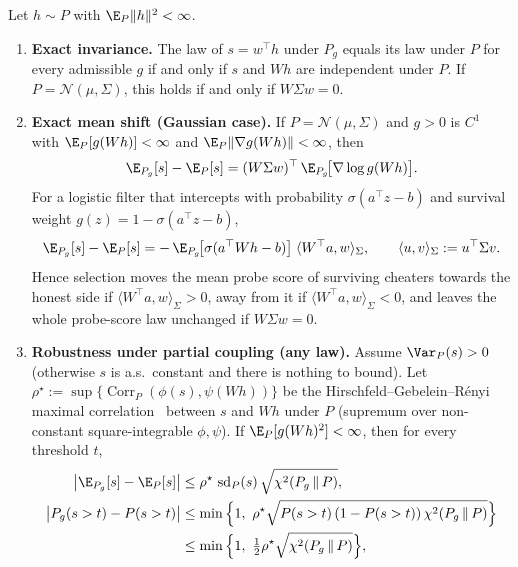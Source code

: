 \begin{theorem}\label{thm:geometry-selection}
Let $h \sim P$ with $\E_P\|h\|^2 < \infty$.
\begin{enumerate}
  \item \textbf{Exact invariance.} The law of $s = w^\top h$ under $P_g$ equals its law under $P$ for every admissible $g$ if and only if $s$ and $Wh$ are independent under $P$. If $P = \mathcal{N}(\mu, \Sigma)$, this holds if and only if $W \Sigma w = 0$.
  \item \textbf{Exact mean shift (Gaussian case).} If $P = \mathcal{N}(\mu, \Sigma)$ and $g > 0$ is $C^1$ with $\E_P[g(Wh)] < \infty$ and $\E_P\|\nabla g(Wh)\| < \infty$, then
  \begin{equation}\label{eq:stein-shift}
    \E_{P_g}[s] - \E_P[s] = (W \Sigma w)^\top\, \E_{P_g}\!\big[\nabla \log g(Wh)\big].
  \end{equation}
  For a logistic filter that intercepts with probability $\sigma(a^\top z - b)$ and survival weight $g(z) = 1 - \sigma(a^\top z - b)$,
  \begin{equation}\label{eq:logistic-shift}
    \E_{P_g}[s] - \E_P[s] = -\,\E_{P_g}\!\big[\sigma(a^\top W h - b)\big]\; \langle W^\top a, w \rangle_{\Sigma},
    \qquad \langle u, v \rangle_\Sigma := u^\top \Sigma v.
  \end{equation}
  Hence selection moves the mean probe score of surviving cheaters towards the honest side if $\langle W^\top a, w\rangle_\Sigma > 0$, away from it if $\langle W^\top a, w\rangle_\Sigma < 0$, and leaves the whole probe-score law unchanged if $W\Sigma w = 0$.
  \item \textbf{Robustness under partial coupling (any law).} Assume $\Var_P(s) > 0$ (otherwise $s$ is a.s.\ constant and there is nothing to bound). Let $\rho^\star := \sup\{\operatorname{Corr}_P(\phi(s), \psi(Wh))\}$ be the Hirschfeld--Gebelein--R\'enyi maximal correlation~\cite{hirschfeld1935,gebelein1941,renyi1959} between $s$ and $Wh$ under $P$ (supremum over non-constant square-integrable $\phi, \psi$). If $\E_P[g(Wh)^2] < \infty$, then for every threshold $t$,
  \begin{align}
    \big|\E_{P_g}[s] - \E_P[s]\big| &\le \rho^\star\, \operatorname{sd}_P(s)\, \sqrt{\chi^2(P_g \,\|\, P)}, \label{eq:robust-mean}\\
    \big|P_g(s > t) - P(s > t)\big| &\le \min\Big\{1,\ \rho^\star \sqrt{P(s>t)\,(1 - P(s>t))\, \chi^2(P_g \,\|\, P)}\Big\} \notag\\ &\le \min\Big\{1,\ \tfrac12 \rho^\star \sqrt{\chi^2(P_g \,\|\, P)}\Big\}, \label{eq:robust-tpr}

\end{align}
\end{enumerate}
\end{theorem}
